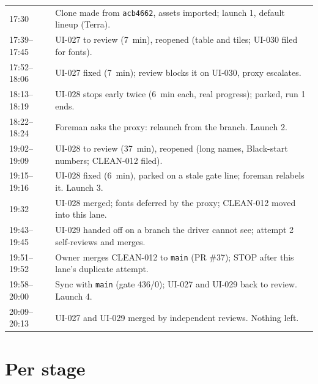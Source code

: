 \documentclass[11pt,a4paper]{article}
\begin{document}
{\small
\begin{tabularx}{\linewidth}{@{}lX@{}}
\toprule
17:30 & Clone made from \texttt{acb4662}, assets imported; launch 1, default lineup (Terra). \\
17:39--17:45 & UI-027 to review (7~min), reopened (table and tiles; UI-030 filed for fonts). \\
17:52--18:06 & UI-027 fixed (7~min); review blocks it on UI-030, proxy escalates. \\
18:13--18:19 & UI-028 stops early twice (6~min each, real progress); parked, run 1 ends. \\
18:22--18:24 & Foreman asks the proxy: relaunch from the branch. Launch 2. \\
19:02--19:09 & UI-028 to review (37~min), reopened (long names, Black-start numbers; CLEAN-012 filed). \\
19:15--19:16 & UI-028 fixed (6~min), parked on a stale gate line; foreman relabels it. Launch 3. \\
19:32 & UI-028 merged; fonts deferred by the proxy; CLEAN-012 moved into this lane. \\
19:43--19:45 & UI-029 handed off on a branch the driver cannot see; attempt 2 self-reviews and merges. \\
19:51--19:52 & Owner merges CLEAN-012 to \texttt{main} (PR \#37); STOP after this lane's duplicate attempt. \\
19:58--20:00 & Sync with \texttt{main} (gate 436/0); UI-027 and UI-029 back to review. Launch 4. \\
20:09--20:13 & UI-027 and UI-029 merged by independent reviews. Nothing left. \\
\bottomrule
\end{tabularx}
}

\section*{Per stage}
\end{document}
